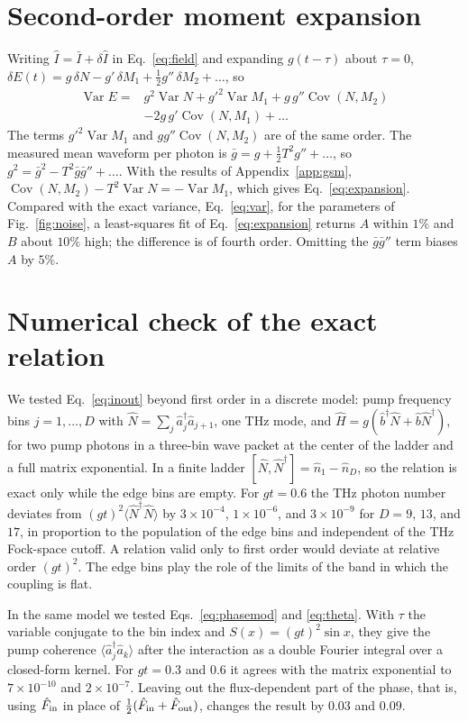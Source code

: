 \documentclass[aps,pra,reprint,superscriptaddress,amsmath,amssymb,floatfix]{revtex4-2}
\newcommand{\Nop}{\hat N}
\newcommand{\Iop}{\hat I}
\newcommand{\Var}{\operatorname{Var}}
\newcommand{\Cov}{\operatorname{Cov}}
\newcommand{\gbar}{\bar g}
\begin{document}
\section{Second-order moment expansion}
\label{app:moments}

Writing $\Iop=\bar I+\delta\Iop$ in Eq.~\eqref{eq:field} and expanding
$g(t-\tau)$ about $\tau=0$,
$\delta E(t)=g\,\delta N-g'\,\delta M_1+\tfrac12g''\,\delta M_2+\dots$, so
\begin{align}
\Var E={}&g^2\Var N+g'^2\Var M_1+g\,g''\Cov(N,M_2)\nonumber\\
&-2g\,g'\Cov(N,M_1)+\dots
\end{align}
The terms $g'^2\Var M_1$ and $gg''\Cov(N,M_2)$ are of the same order. The
measured mean waveform per photon is $\gbar=g+\tfrac12T^2g''+\dots$, so
$g^2=\gbar^2-T^2\gbar\gbar''+\dots$. With the results of
Appendix~\ref{app:gsm}, $\Cov(N,M_2)-T^2\Var N=-\Var M_1$, which gives
Eq.~\eqref{eq:expansion}. Compared with the exact variance,
Eq.~\eqref{eq:var}, for the parameters of Fig.~\ref{fig:noise}, a
least-squares fit of Eq.~\eqref{eq:expansion} returns $A$ within $1\%$ and
$B$ about $10\%$ high; the difference is of fourth order. Omitting the
$\gbar\gbar''$ term biases $A$ by $5\%$.

\section{Numerical check of the exact relation}
\label{app:check}

We tested Eq.~\eqref{eq:inout} beyond first order in a discrete model: pump
frequency bins $j=1,\dots,D$ with $\Nop=\sum_j\hat a_j^\dagger\hat a_{j+1}$,
one THz mode, and $\hat H=g(\hat b^\dagger\Nop+\hat b\Nop^\dagger)$, for two
pump photons in a three-bin wave packet at the center of the ladder and a
full matrix exponential. In a finite ladder $[\Nop,\Nop^\dagger]=\hat
n_1-\hat n_D$, so the relation is exact only while the edge bins are empty.
For $gt=0.6$ the THz photon number deviates from $(gt)^2\langle\Nop^\dagger
\Nop\rangle$ by $3\times10^{-4}$, $1\times10^{-6}$, and $3\times10^{-9}$ for
$D=9$, $13$, and $17$, in proportion to the population of the edge bins and
independent of the THz Fock-space cutoff. A relation valid only to first
order would deviate at relative order $(gt)^2$. The edge bins play the role
of the limits of the band in which the coupling is flat.

In the same model we tested Eqs.~\eqref{eq:phasemod} and \eqref{eq:theta}.
With $\tau$ the variable conjugate to the bin index and
$S(x)=(gt)^2\sin x$, they give the pump coherence
$\langle\hat a_j^\dagger\hat a_k\rangle$ after the interaction as a double
Fourier integral over a closed-form kernel. For $gt=0.3$ and $0.6$ it agrees
with the matrix exponential to $7\times10^{-10}$ and $2\times10^{-7}$.
Leaving out the flux-dependent part of the phase, that is, using
$\hat F_{\rm in}$ in place of
$\tfrac12(\hat F_{\rm in}+\hat F_{\rm out})$, changes the result by $0.03$ and
$0.09$.
\end{document}
